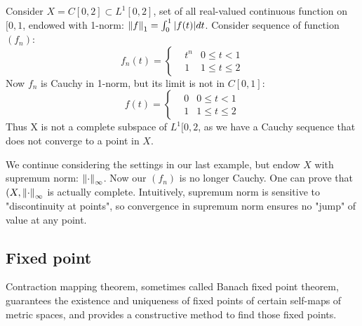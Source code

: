 \documentclass{article}
\begin{document}
\begin{example}\rm\nextline
	\placeholder
\end{example}

\begin{example}\rm\nextline
	Consider $X=C[0,2]\subset L^1 [0,2]$, set of all real-valued continuous function on $[0,1$, endowed with 1-norm: $\left\|{f}\right\|_1=\int_0^1|f(t)|dt$. Consider sequence of function $(f_n)$:
	\begin{equation}
		f_n(t)=\left\{
		\begin{aligned}\nonumber
			 & t^n & 0\leq t<1     \\
			 & 1   & 1\leq t\leq 2
		\end{aligned}
		\right.
	\end{equation}
	Now $f_n$ is Cauchy in 1-norm, but its limit is not in $C[0,1]$:
	\begin{equation}
		f(t)=\left\{
		\begin{aligned}\nonumber
			 & 0 & 0\leq t<1     \\
			 & 1 & 1\leq t\leq 2
		\end{aligned}
		\right.
	\end{equation}
	Thus X is not a complete subspace of $L^1[0,2$, as we have a Cauchy sequence that does not converge to a point in $X$.
\end{example}

\begin{example}\rm\nextline
	We continue considering the settings in our last example, but endow $X$ with supremum norm: $\left\|{\cdot}\right\|_\infty$. Now our $(f_n)$ is no longer Cauchy. One can prove that $(X,\left\|{\cdot}\right\|_\infty$ is actually complete. Intuitively, supremum norm is sensitive to "discontinuity at points", so convergence in supremum norm ensures no "jump" of value at any point.
\end{example}
\newpage

\newpage
\subsection{Fixed point}
Contraction mapping theorem, sometimes called Banach fixed point theorem, guarantees the existence and uniqueness of fixed points of certain self-maps of metric spaces, and provides a constructive method to find those fixed points.
\end{document}

